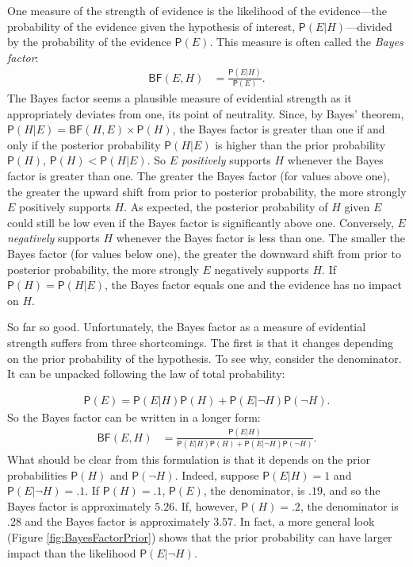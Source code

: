 \documentclass[
  10pt,
  dvipsnames,enabledeprecatedfontcommands]{scrartcl}
\newcommand{\n}{\neg}
\newcommand{\pr}[1]{\mathsf{P}(#1)}
\begin{document}
One measure of the strength of evidence is the likelihood of the
evidence---the probability of the evidence given the hypothesis of
interest, \(\pr{E \vert H}\)---divided by the probability of the
evidence \(\pr{E}\). This measure is often called the
\emph{Bayes factor}: \begin{align}\label{eq:BF}
\tag{BF}
\mathsf{BF}(E,H) & = \frac{\pr{E \vert H}}{\pr{E}}.
\end{align} \noindent The Bayes factor seems a plausible measure of
evidential strength as it appropriately deviates from one, its point of
neutrality. Since, by Bayes' theorem,
\(\pr{H \vert E} = \mathsf{BF}(H, E) \times \pr{H}\), the Bayes factor
is greater than one if and only if the posterior probability
\(\pr{H \vert E}\) is higher than the prior probability \(\pr{H}\),
\(\pr{H}<\pr{H\vert E}\). So \(E\) \textit{positively} supports \(H\)
whenever the Bayes factor is greater than one. The greater the Bayes
factor (for values above one), the greater the upward shift from prior
to posterior probability, the more strongly \(E\) positively supports
\(H\). As expected, the posterior probability of \(H\) given \(E\) could
still be low even if the Bayes factor is significantly above one.
Conversely, \(E\) \textit{negatively} supports \(H\) whenever the Bayes
factor is less than one. The smaller the Bayes factor (for values below
one), the greater the downward shift from prior to posterior
probability, the more strongly \(E\) negatively supports \(H\). If
\(\pr{H}=\pr{H\vert E}\), the Bayes factor equals one and the evidence
has no impact on \(H\).

So far so good. Unfortunately, the Bayes factor as a measure of
evidential strength suffers from three shortcomings. The first is that
it changes depending on the prior probability of the hypothesis. To see
why, consider the denominator. It can be unpacked following the law of
total probability:

\vspace{-3mm}

\begin{align} \label{eq:lotpSimple}
\pr{E}= \pr{E \vert H} \pr{H}+\pr{E \vert \neg H} \pr{\neg H}.
\end{align} \noindent  So the Bayes factor can be written in a longer
form: \begin{align}\label{eq:BFlotp}
\mathsf{BF}(E,H) & = \frac{\pr{E \vert H}}{\pr{E \vert H} \pr{H}+\pr{E \vert \neg H} \pr{\neg H}}.
\end{align} \noindent What should be clear from this formulation is that
it depends on the prior probabilities \(\pr{H}\) and \(\pr{\neg H}\).
Indeed, suppose \(\pr{E \vert H} = 1\) and \(\pr{E \vert \neg H} = .1\).
If \(\pr{H}=.1\), \(\pr{E}\), the denominator, is \(.19\), and so the
Bayes factor is approximately \(5.26\). If, however, \(\pr{H} =.2\), the
denominator is \(.28\) and the Bayes factor is approximately \(3.57\).
In fact, a more general look (Figure \ref{fig:BayesFactorPrior}) shows
that the prior probability can have larger impact than the likelihood
\(\pr{E \vert \n H}\).
\end{document}
